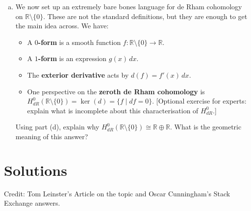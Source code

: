 \documentclass[12pt]{article}
\begin{document}
\begin{enumerate}[(a)]
    \item We now set up an extremely bare bones language for de Rham cohomology on $\mathbb{R} \setminus \{0\}$. These are not the standard definitions, but they are enough to get the main idea across. We have:
    \begin{itemize}
        \item A \textbf{$0$-form} is a smooth function $f \colon \mathbb{R} \setminus \{0\} \to \mathbb{R}$.
        \item A \textbf{$1$-form} is an expression $g(x)\,dx$.
        \item The \textbf{exterior derivative} acts by $d(f) = f'(x)\,dx$.
        \item One perspective on the \textbf{zeroth de Rham cohomology} is $H^0_{dR}(\mathbb{R} \setminus \{0\}) = \ker(d) = \{f \mid df = 0\}$. [Optional exercise for experts: explain what is incomplete about this characterisation of $H^0_{dR}$.]
    \end{itemize}
    Using part (d), explain why $H^0_{dR}(\mathbb{R} \setminus \{0\}) \cong \mathbb{R} \oplus \mathbb{R}$. What is the geometric meaning of this answer?

\end{enumerate}

\newpage
\section*{Solutions}

Credit: Tom Leinster's Article on the topic and Oscar Cunningham's Stack Exchange answers.
\end{document}
